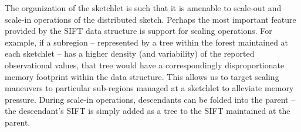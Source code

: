 The organization of the sketchlet is such that it is amenable to scale-out and scale-in operations of the distributed sketch. Perhaps the most important feature provided by the SIFT data structure is support for scaling operations. For example, if a subregion – represented by a tree within the forest maintained at each sketchlet -- has a higher density (and variability) of the reported observational values, that tree would have a correspondingly disproportionate memory footprint within the data structure. This allows us to target scaling maneuvers to particular sub-regions managed at a sketchlet to alleviate memory pressure.  During scale-in operations, descendants can be folded into the parent -- the descendant's SIFT is simply added as a tree to the SIFT maintained at the parent.
